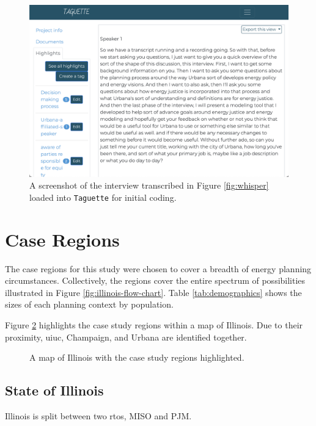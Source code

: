 \begin{enumerate}
\begin{figure}[htbp!]
    \centering
    \includegraphics[width=0.6\columnwidth]{figures/07_interview_chapter/taguette-screenshot}
    \caption{A screenshot of the interview transcribed in Figure \ref{fig:whisper}
    loaded into \texttt{Taguette} for initial coding.}
    \label{fig:taguette}
\end{figure}

\end{enumerate}

\section{Case Regions}
\label{section:cases}

The case regions for this study were chosen to cover a breadth of energy
planning circumstances. Collectively, the regions cover the entire spectrum of
possibilities illustrated in Figure \ref{fig:illinois-flow-chart}. Table
\ref{tab:demographics} shows the sizes of each planning context by population.

Figure \ref{fig:illinois-plot} highlights the case study regions within a map of
Illinois. Due to their proximity, \ac{uiuc}, Champaign, and Urbana are
identified together.

\begin{figure}[ht!]
    \centering
    \resizebox{0.4\columnwidth}{!}{}
    \caption{A map of Illinois with the case study regions highlighted.}
    \label{fig:illinois-plot}
\end{figure}

\subsection{State of Illinois}
Illinois is split between two \acp{rto}, MISO and PJM.


